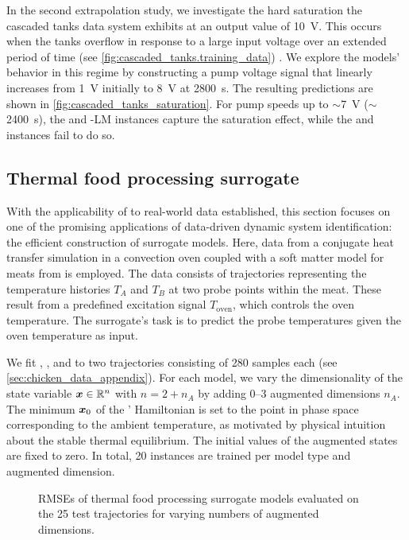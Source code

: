 In the second extrapolation study, we investigate the hard saturation the cascaded tanks data system exhibits at an output value of \qty{10}{\volt}. This occurs when the tanks overflow in response to a large input voltage over an extended period of time (see \cref{fig:cascaded_tanks.training_data}) \cite{schoukens2016}. We explore the models' behavior in this regime by constructing a pump voltage signal that linearly increases from \qty{1}{\volt} initially to \qty{8}{\volt} at \qty{2800}{\second}. 
The resulting predictions are shown in \cref{fig:cascaded_tanks_saturation}. For pump speeds up to $\sim$\qty{7}{\volt} ($\sim$\qty{2400}{\second}), the \sPHNN and \sPHNN-LM instances capture the saturation effect, while the \NODE and \PHNN instances fail to do so.

\subsection{Thermal food processing surrogate}\label{sec:chicken_data}

With the applicability of \sPHNNs to real-world data established, this section focuses on one of the promising applications of data-driven dynamic system identification: the efficient construction of surrogate models.
Here, data from a conjugate heat transfer simulation in a convection oven coupled with a soft matter model for meats from \citet{kannapinn2022,kannapinn2024} is employed. 
The data consists of trajectories representing the temperature histories $T_A$ and $T_B$ at two probe points within the meat. These result from a predefined excitation signal $T_{\text{oven}}$, which controls the oven temperature. 
The surrogate's task is to predict the probe temperatures given the oven temperature as input. 

We fit \sPHNNs, \NODEs, and \PHNNs to two trajectories consisting of \num{280} samples each (see \cref{sec:chicken_data_appendix}). 
For each model, we vary the dimensionality of the state variable ${\boldsymbol{x}\in{\mathbb{R}}^n}$ with $n=2+n_A$ by adding \numrange{0}{3} augmented dimensions $n_A$.
The minimum $\boldsymbol{x}_0$ of the \sPHNNs' Hamiltonian is set to the point in phase space corresponding to the ambient temperature, as motivated by physical intuition about the stable thermal equilibrium.
The initial values of the augmented states are fixed to zero.
In total, \num{20} instances are trained per model type and augmented dimension. 

\begin{figure}[t]
    \centering
    \vspace*{-2mm}
    \vspace*{-2mm}
    \caption{\Glspl{RMSE} of thermal food processing surrogate models evaluated on the \num{25} test trajectories for varying numbers of augmented dimensions. 
        }
    \label{fig:chicken_data_rmse}
    \vskip -0.2cm
\end{figure}

